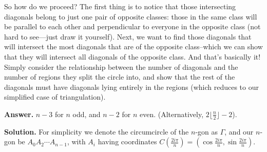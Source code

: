 \documentclass[11pt,a4paper]{article}
\begin{document}
\begin{itemize}
So how do we proceed? The first thing is to notice that those intersecting diagonals belong to just one pair of opposite classes: those in the same class will be parallel to each other and perpendicular to everyone in the opposite class (not hard to see---just draw it yourself). Next, we want to find those diagonals that will intersect the most diagonals that are of the opposite class--which we can show that they will intersect all diagonals of the opposite class. And that's basically it! Simply consider the relationship between the number of diagonals and the number of regions they split the circle into, and show that the rest of the diagonals must have diagonals lying entirely in the regions (which reduces to our simplified case of triangulation). 

\textbf {Answer. }$n-3$ for $n$ odd, and $n-2$ for $n$ even. (Alternatively, $2\lfloor \frac n2\rfloor-2$). 

\textbf{Solution.}
For simplicity we denote the circumcircle of the $n$-gon as $\Gamma$, and our $n$-gon be $A_0A_2\cdots A_{n-1}$, 
with $A_i$ having coordinates $C\left(\frac{2i\pi}{n}\right)=\left(\cos\frac{2i\pi}{n}, \sin\frac{2i\pi}{n}\right)$. 


\end{itemize}
\end{document}
